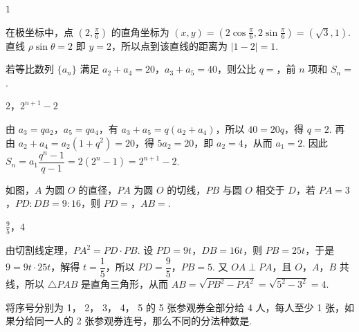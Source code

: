 \begin{answer}
\(1\)
\end{answer}

\begin{solution}

在极坐标中，点 \(\left(2,\frac{\pi}{6}\right)\) 的直角坐标为
\((x,y)=\left(2\cos\frac{\pi}{6},2\sin\frac{\pi}{6}\right)=(\sqrt3,1)\). 直线 \(\rho\sin\theta=2\) 即 \(y=2\)，所以点到该直线的距离为 \(\lvert1-2\rvert=1\).
\end{solution}

\begin{problem}
若等比数列 \( \{a_{n}\} \) 满足 \(a_{2} + a_{4} = 20\)，\(a_{3} + a_{5} = 40\)，则公比 \(q =\)\fillinblank{}，前 \(n\) 项和 \( S_{n} = \)\fillinblank{}.
\end{problem}

\begin{answer}
\(2\)，\(2^{n+1} - 2\)
\end{answer}

\begin{solution}

由 \(a_3=qa_2\)，\(a_5=qa_4\)，有
\(a_3+a_5=q(a_2+a_4)\)，所以 \(40=20q\)，得 \(q=2\). 再由 \(a_2+a_4=a_2(1+q^2)=20\)，得 \(5a_2=20\)，即 \(a_2=4\)，从而 \(a_1=2\). 因此
\(S_n=a_1\dfrac{q^n-1}{q-1}=2(2^n-1)=2^{n+1}-2\).
\end{solution}

\begin{problem}
如图，\(A\) 为圆 \(O\) 的直径，\(PA\) 为圆 \(O\) 的切线，\(PB\) 与圆 \(O\) 相交于 \(D\)，若 \(PA = 3\)，\(PD:DB = 9:16\)，则 \(PD =\)\fillinblank{}，\(AB =\)\fillinblank{}.
\end{problem}

\begin{answer}
\(\frac{9}{5}\)，\(4\)
\end{answer}

\begin{solution}

由切割线定理，\(PA^2=PD\cdot PB\). 设 \(PD=9t\)，\(DB=16t\)，则 \(PB=25t\)，于是
\(9=9t\cdot25t\)，解得 \(t=\dfrac15\)，所以 \(PD=\dfrac95\)，\(PB=5\). 又 \(OA\perp PA\)，且 \(O\)，\(A\)，\(B\) 共线，所以 \(\triangle PAB\) 是直角三角形，从而
\(AB=\sqrt{PB^2-PA^2}=\sqrt{5^2-3^2}=4\).
\end{solution}

\begin{problem}
将序号分别为 1， 2， 3， 4， 5 的 5 张参观券全部分给 4 人，每人至少 1 张，如果分给同一人的 2 张参观券连号，那么不同的分法种数是\fillinblank{}.
\end{problem}

